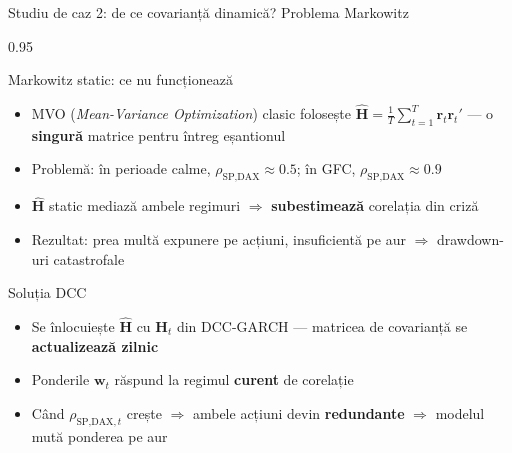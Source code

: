 \documentclass[9pt, aspectratio=169, t]{beamer}
\begin{document}
\begin{frame}{Studiu de caz 2: de ce covarianță dinamică? Problema Markowitz}
    \begin{cminipage}{0.95\textwidth}
    {\footnotesize
    \begin{block}{Markowitz static: ce nu funcționează}
        \begin{itemize}\setlength{\itemsep}{1pt}
            \item MVO (\textit{Mean-Variance Optimization}) clasic folosește $\hat{\mathbf{H}} = \frac{1}{T}\sum_{t=1}^{T}\mathbf{r}_t\mathbf{r}_t'$ --- o \textbf{singură} matrice pentru întreg eșantionul
            \item Problemă: în perioade calme, $\rho_{\text{SP,DAX}} \approx 0.5$; în GFC, $\rho_{\text{SP,DAX}} \approx 0.9$
            \item $\hat{\mathbf{H}}$ static mediază ambele regimuri $\Rightarrow$ \textbf{subestimează} corelația din criză
            \item Rezultat: prea multă expunere pe acțiuni, insuficientă pe aur $\Rightarrow$ drawdown-uri catastrofale
        \end{itemize}
    \end{block}
    \begin{block}{Soluția DCC}
        \begin{itemize}\setlength{\itemsep}{0pt}
            \item Se înlocuiește $\hat{\mathbf{H}}$ cu $\mathbf{H}_t$ din DCC-GARCH --- matricea de covarianță se \textbf{actualizează zilnic}
            \item Ponderile $\mathbf{w}_t$ răspund la regimul \textbf{curent} de corelație
            \item Când $\rho_{\text{SP,DAX},t}$ crește $\Rightarrow$ ambele acțiuni devin \textbf{redundante} $\Rightarrow$ modelul mută ponderea pe aur
        \end{itemize}
    \end{block}
    }
    \end{cminipage}
\end{frame}
\end{document}
